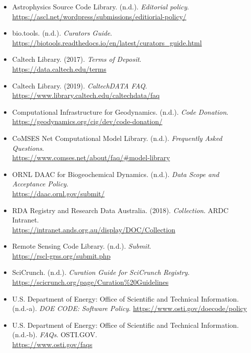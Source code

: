 \documentclass[11pt]{article}
\begin{document}
\begin{itemize}

\item Astrophysics Source Code Library. (n.d.). \emph{Editorial policy}.\\
\url{https://ascl.net/wordpress/submissions/editiorial-policy/}

\item bio.tools. (n.d.). \emph{Curators Guide}.\\
\url{https://biotools.readthedocs.io/en/latest/curators\_guide.html}

\item Caltech Library. (2017). \emph{Terms of Deposit}.\\
\url{https://data.caltech.edu/terms}

\item Caltech Library. (2019). \emph{CaltechDATA FAQ}.\\
\url{https://www.library.caltech.edu/caltechdata/faq}

\item Computational Infrastructure for Geodynamics. (n.d.). \emph{Code Donation}.\\
\url{https://geodynamics.org/cig/dev/code-donation/}

\item CoMSES Net Computational Model Library. (n.d.). \emph{Frequently Asked Questions}.\\
\url{https://www.comses.net/about/faq/\#model-library}

\item ORNL DAAC for Biogeochemical Dynamics. (n.d.). 
\emph{Data Scope and Acceptance Policy}.\\
\url{https://daac.ornl.gov/submit/}

\item RDA Registry and Research Data Australia. (2018). \emph{Collection}.
ARDC Intranet.\\
\url{https://intranet.ands.org.au/display/DOC/Collection}

\item Remote Sensing Code Library. (n.d.). \emph{Submit}.\\
\url{https://rscl-grss.org/submit.php}

\item SciCrunch. (n.d.). \emph{Curation Guide for SciCrunch Registry}.\\
\url{https://scicrunch.org/page/Curation\%20Guidelines}

\item U.S. Department of Energy: Office of Scientific and Technical Information. (n.d.-a). \emph{DOE CODE: Software Policy}.
\url{https://www.osti.gov/doecode/policy}

\item U.S. Department of Energy: Office of Scientific and Technical
Information. (n.d.-b). \emph{FAQs}. OSTI.GOV.\\
\url{https://www.osti.gov/faqs}

\end{itemize}
\end{document}
